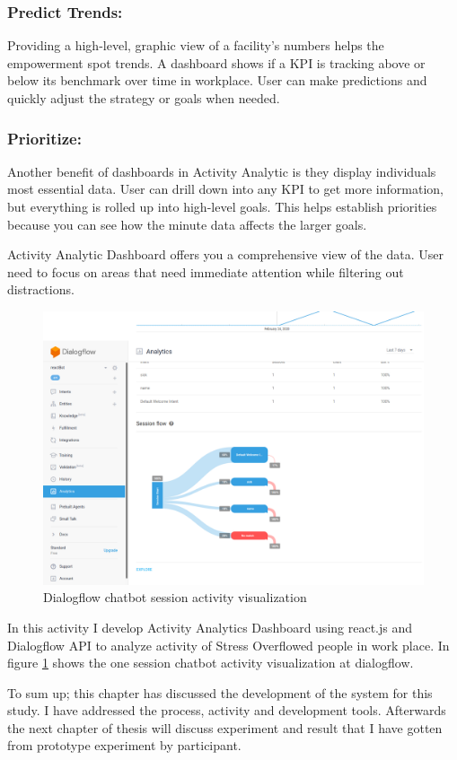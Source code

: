 \subsubsection*{Predict Trends:}
Providing a high-level, graphic view of a facility’s numbers helps the empowerment spot trends. A dashboard shows if a \acs{KPI} is tracking above or below its benchmark over time in workplace. User can make predictions and quickly adjust the strategy or goals when needed.
\subsubsection*{Prioritize:}
Another benefit of dashboards in Activity Analytic is they display individuals most essential data. User can drill down into any \acs{KPI} to get more information, but everything is rolled up into high-level goals. This helps establish priorities because you can see how the minute data affects the larger goals.

Activity Analytic Dashboard offers you a comprehensive view of the data. User need to focus on areas that need immediate attention while filtering out distractions.

\begin{figure}[hbt!] 
  \centering
  \includegraphics[width=1.0\linewidth]{chap4/image4/flow2.png}
  \caption[Dialogflow chatbot session activity visualization ]{Dialogflow chatbot session activity visualization}
  \label{fig:flow2}
\end{figure}

In this activity I develop Activity Analytics Dashboard using react.js and Dialogflow API to analyze activity of Stress Overflowed people in work place.  In figure \ref{fig:flow2} shows the one session chatbot activity visualization at dialogflow.

To sum up; this chapter has discussed the development of the system for this study. I have addressed the process, activity and development tools. Afterwards  the  next chapter of thesis will discuss experiment and result that I have gotten from prototype experiment by participant.


